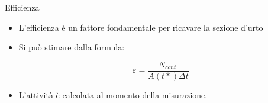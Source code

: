 \documentclass [xcolor=svgnames] {beamer}
\begin{document}
\begin{frame}{Efficienza}
	\begin{itemize}%
		\item<1-> L'efficienza è un fattore fondamentale per ricavare la sezione d'urto
		\item<2-> Si può stimare dalla formula:
		
		\begin{equation}
			\varepsilon = \dfrac{N_{cont.}}{A(t*) \Delta t}
		\end{equation}
		
		\item<3-> L'attività è calcolata al momento della misurazione. %
		
	\end{itemize}
\end{frame}
\end{document}
